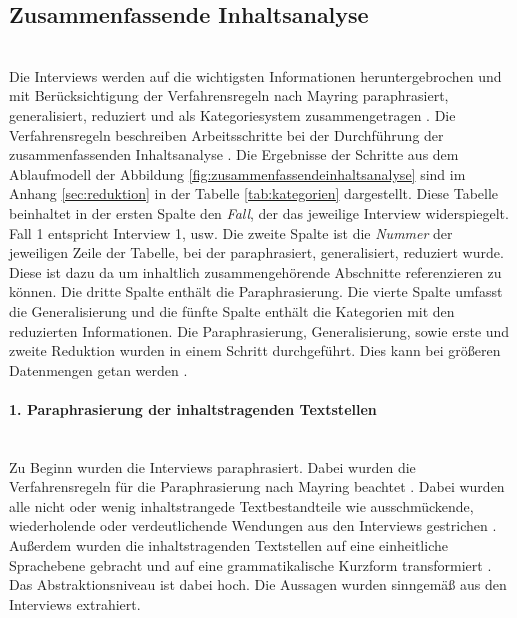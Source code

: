 %	
%	
%	
%	
\subsection*{Zusammenfassende Inhaltsanalyse}\mbox{} \\
Die Interviews werden auf die wichtigsten Informationen heruntergebrochen und mit Berücksichtigung der Verfahrensregeln nach Mayring paraphrasiert, generalisiert, reduziert und als Kategoriesystem zusammengetragen \cite{mayring1994qualitative}. Die Verfahrensregeln beschreiben Arbeitsschritte bei der Durchführung der zusammenfassenden Inhaltsanalyse \cite{mayring1994qualitative}. Die Ergebnisse der Schritte aus dem Ablaufmodell der Abbildung \ref{fig:zusammenfassendeinhaltsanalyse} sind im Anhang \ref{sec:reduktion} in der Tabelle \ref{tab:kategorien} dargestellt. Diese Tabelle beinhaltet in der ersten Spalte den \emph{Fall}, der das jeweilige Interview widerspiegelt. Fall 1 entspricht Interview 1, usw. Die zweite Spalte ist die \emph{Nummer} der jeweiligen Zeile der Tabelle, bei der paraphrasiert, generalisiert, reduziert wurde. Diese ist dazu da um inhaltlich zusammengehörende Abschnitte referenzieren zu können. Die dritte Spalte enthält die Paraphrasierung. Die vierte Spalte umfasst die Generalisierung und die fünfte Spalte enthält die Kategorien mit den reduzierten Informationen. Die Paraphrasierung, Generalisierung, sowie erste und zweite Reduktion wurden in einem Schritt durchgeführt. Dies kann bei größeren Datenmengen getan werden \cite{mayring2019qualitative}.
\paragraph{1. Paraphrasierung der inhaltstragenden Textstellen}\mbox{} \\
Zu Beginn wurden die Interviews paraphrasiert. Dabei wurden die Verfahrensregeln für die Paraphrasierung nach Mayring beachtet \cite{mayring2019qualitative}. Dabei wurden alle nicht oder wenig inhaltstrangede Textbestandteile wie ausschmückende, wiederholende oder verdeutlichende Wendungen aus den Interviews gestrichen \cite{mayring2019qualitative}. Außerdem wurden die inhaltstragenden Textstellen auf eine einheitliche Sprachebene gebracht und auf eine grammatikalische Kurzform transformiert \cite{mayring2019qualitative}. Das Abstraktionsniveau ist dabei hoch. Die Aussagen wurden sinngemäß aus den Interviews extrahiert.\\

